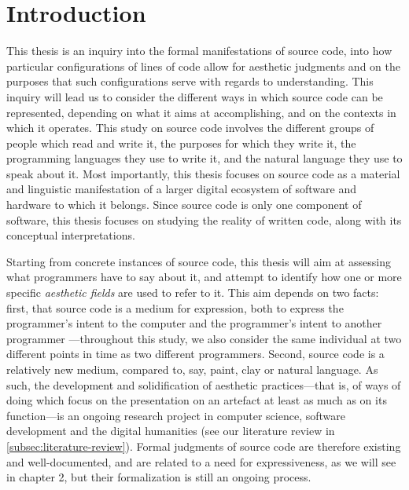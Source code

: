 \chapter{Introduction}
\label{chap:introduction}

This thesis is an inquiry into the formal manifestations of source code, into how particular configurations of lines of code allow for aesthetic judgments and on the purposes that such configurations serve with regards to understanding. This inquiry will lead us to consider the different ways in which source code can be represented, depending on what it aims at accomplishing, and on the contexts in which it operates.
This study on source code involves the different groups of people which read and write it, the purposes for which they write it, the programming languages they use to write it, and the natural language they use to speak about it. Most importantly, this thesis focuses on source code as a material and linguistic manifestation of a larger digital ecosystem of software and hardware to which it belongs. Since source code is only one component of software, this thesis focuses on studying the reality of written code, along with its conceptual interpretations.

Starting from concrete instances of source code, this thesis will aim at assessing what programmers have to say about it, and attempt to identify how one or more specific \emph{aesthetic fields} are used to refer to it. This aim depends on two facts: first, that source code is a medium for expression, both to express the programmer's intent to the computer \citep{dijkstra_craftsman_1982} and the programmer's intent to another programmer \citep{abelson_structure_1979}—throughout this study, we also consider the same individual at two different points in time as two different programmers. Second, source code is a relatively new medium, compared to, say, paint, clay or natural language. As such, the development and solidification of aesthetic practices—that is, of ways of doing which focus on the presentation on an artefact at least as much as on its function—is an ongoing research project in computer science, software development and the digital humanities (see our literature review in \ref{subsec:literature-review}). Formal judgments of source code are therefore existing and well-documented, and are related to a need for expressiveness, as we will see in chapter 2, but their formalization is still an ongoing process.

